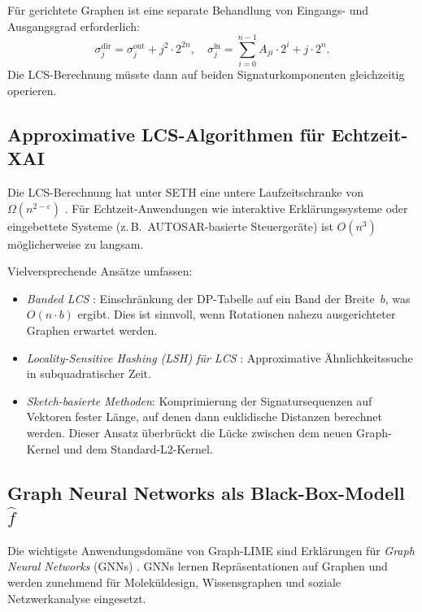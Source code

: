 ﻿\documentclass[a4paper,12pt]{article}
\theoremstyle{definition}
\begin{document}
Für gerichtete Graphen ist eine separate Behandlung von Eingangs- und Ausgangsgrad
erforderlich:
\[
  \sigma_j^{\mathrm{dir}} = \sigma_j^{\mathrm{out}} + j^2 \cdot 2^{2n},
  \quad \sigma_j^{\mathrm{in}} = \sum_{i=0}^{n-1} A_{ji} \cdot 2^i + j \cdot 2^n.
\]
Die LCS-Berechnung müsste dann auf beiden Signaturkomponenten gleichzeitig operieren.

\subsection{Approximative LCS-Algorithmen für Echtzeit-XAI}

Die LCS-Berechnung hat unter SETH eine untere Laufzeitschranke von
$\Omega(n^{2-\varepsilon})$ \citep{Abboud2015}.
Für Echtzeit-Anwendungen wie interaktive Erklärungssysteme oder eingebettete
Systeme (z.\,B.\ AUTOSAR-basierte Steuergeräte) ist $O(n^3)$ möglicherweise
zu langsam.

Vielversprechende Ansätze umfassen:
\begin{itemize}
  \item \emph{Banded LCS} \citep{Allison1986}: Einschränkung der DP-Tabelle auf
        ein Band der Breite~$b$, was $O(n \cdot b)$ ergibt.
        Dies ist sinnvoll, wenn Rotationen nahezu ausgerichteter Graphen erwartet werden.
  \item \emph{Locality-Sensitive Hashing (LSH) für LCS} \citep{Indyk1998}:
        Approximative Ähnlichkeitssuche in subquadratischer Zeit.
  \item \emph{Sketch-basierte Methoden}: Komprimierung der Signatursequenzen
        auf Vektoren fester Länge, auf denen dann euklidische Distanzen berechnet
        werden.
        Dieser Ansatz überbrückt die Lücke zwischen dem neuen Graph-Kernel und
        dem Standard-L2-Kernel.
\end{itemize}

\subsection{Graph Neural Networks als Black-Box-Modell $\hat{f}$}

Die wichtigste Anwendungsdomäne von Graph-LIME sind Erklärungen für
\emph{Graph Neural Networks} (GNNs) \citep{Scarselli2009, Kipf2017}.
GNNs lernen Repräsentationen auf Graphen und werden zunehmend für
Moleküldesign, Wissensgraphen und soziale Netzwerkanalyse eingesetzt.
\end{document}
